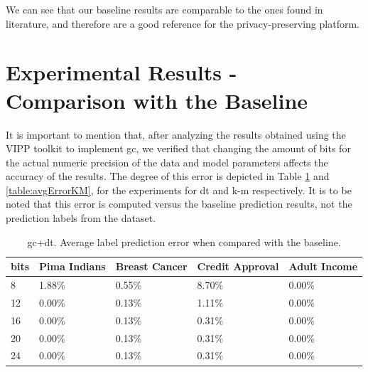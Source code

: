 We can see that our baseline results are comparable to the ones found in literature, and therefore are a good reference for the privacy-preserving platform.


\section{Experimental Results - Comparison with the Baseline}
\label{sec:ExperimentalResultsComparisonBaseline}


It is important to mention that, after analyzing the results obtained using the VIPP toolkit to implement \ac{gc}, we verified that changing the amount of bits for the actual numeric precision of the data and model parameters affects the accuracy of the results. The degree of this error is depicted in Table \ref{table:avgErrorDT} and \ref{table:avgErrorKM}, for the experiments for \ac{dt} and \ac{k-m} respectively. It is to be noted that this error is computed versus the baseline prediction results, not the prediction labels from the dataset. 

\begin{table}[htp]
\centering
\caption{\acs{gc}+\acs{dt}. Average label prediction error when compared with the baseline.}
\label{table:avgErrorDT}
\begin{tabular}{|l|l|l|l|l|}
\hline
\textbf{bits} & \textbf{Pima Indians} & \textbf{Breast Cancer} & \textbf{Credit Approval} & \textbf{Adult Income} \\ \hline
8    & 1.88\%       & 0.55\%        & 8.70\%          & 0.00\%       \\ \hline
12   & 0.00\%       & 0.13\%        & 1.11\%          & 0.00\%       \\ \hline
16   & 0.00\%       & 0.13\%        & 0.31\%          & 0.00\%       \\ \hline
20   & 0.00\%       & 0.13\%        & 0.31\%          & 0.00\%       \\ \hline
24   & 0.00\%       & 0.13\%        & 0.31\%          & 0.00\%       \\ \hline
\end{tabular}
\end{table}

